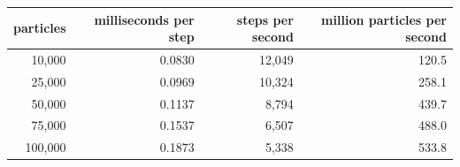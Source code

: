 \begin{tabular}{r rrr}
\toprule
particles & milliseconds per step & steps per second & million particles per second \\
\midrule
10,000 & 0.0830 & 12,049 & 120.5 \\
25,000 & 0.0969 & 10,324 & 258.1 \\
50,000 & 0.1137 & 8,794 & 439.7 \\
75,000 & 0.1537 & 6,507 & 488.0 \\
100,000 & 0.1873 & 5,338 & 533.8 \\
\bottomrule
\end{tabular}
